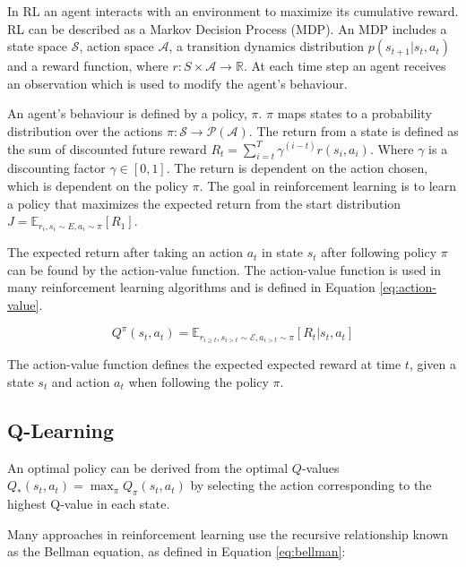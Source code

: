 
In RL an agent interacts with an environment to maximize its cumulative reward. RL can be described as a Markov Decision Process (MDP). An MDP includes a state space $\mathcal{S}$, action space $\mathcal{A}$, a transition dynamics distribution $p(s_{t+1}|s_t,a_t)$ and a reward function, where $r:S\times \mathcal{A} \rightarrow \mathbb{R}$. At each time step an agent receives an observation which is used to modify the agent's behaviour.

An agent's behaviour is defined by a policy, $\pi$. $\pi$ maps states to a probability distribution over the actions $\pi:\mathcal{S}\rightarrow \mathcal{P}(\mathcal{A})$. The return from a state is defined as the sum of discounted future reward $R_t=\sum_{i=t}^T\gamma^{(i-t)}r(s_i,a_i)$. Where $\gamma$ is a discounting factor $\gamma \in [0,1]$. The return is dependent on the action chosen, which is dependent on the policy $\pi$. The goal in reinforcement learning is to learn a policy that maximizes the expected return from the start distribution $J=\mathbb{E}_{r_i,s_i \sim E,a_i \sim \pi}[R_1]$. 

The expected return after taking an action $a_t$ in state $s_t$ after following policy $\pi$ can be found by the action-value function. The action-value function is used in many reinforcement learning algorithms and is defined in Equation \ref{eq:action-value}.

\begin{equation}
\label{eq:action-value}
Q^{\pi}(s_t,a_t)=\mathbb{E}_{r_{i\geq t},s_{i>t}\sim \mathcal{E},a_{i>t}\sim\pi}[R_t|s_t,a_t]
\end{equation}

The action-value function defines the expected expected reward at time $t$, given a state $s_t$ and action $a_t$ when following the policy $\pi$.

\subsection{Q-Learning}

An optimal policy can be derived from the optimal $Q$-values $Q_*(s_t,a_t)=\max_\pi Q_\pi(s_t,a_t)$ by selecting the action corresponding to the highest Q-value in each state.

Many approaches in reinforcement learning use the recursive relationship known as the Bellman equation, as defined in Equation \ref{eq:bellman}:

